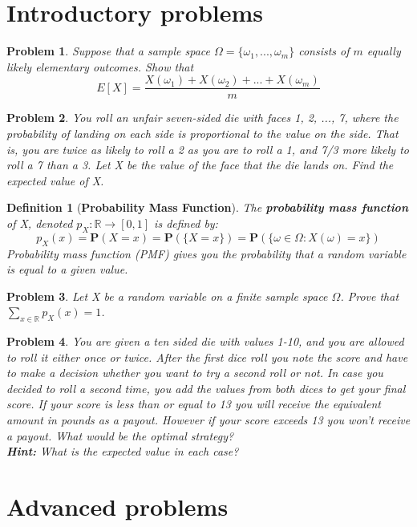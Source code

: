 \documentclass[a4paper,12pt]{article}
\theoremstyle{perfect}
\newtheorem{dfn}{Definition}
\newtheorem{prb}{Problem}
\newcommand{\R}{\mathbb{R}}
\newcommand{\PP}{\mathbf{P}}
\begin{document}
\section{Introductory problems}

\begin{prb}
Suppose that a sample space $\Omega = \{\omega_1, ..., \omega_m\}$ consists of $m$ equally likely elementary outcomes. Show that 
$$E[X] = \frac{X(\omega_1) + X(\omega_2) + ... + X(\omega_m)}{m}$$
\end{prb}

\begin{prb}
You roll an unfair seven-sided die with faces 1, 2, ..., 7, where the probability of landing on each side is proportional to the value on the side. That is, you are twice as likely to roll a 2 as you are to roll a 1, and 7/3 more likely to roll a 7 than a 3. Let X be the value of the face that the die lands on. Find the expected value of X.
\end{prb}

\begin{dfn}[\textbf{Probability Mass Function}]
The \textbf{probability mass function} of X, denoted $p_X : \R \to [0, 1]$ is defined by:
$$p_X(x) = \PP(X = x) = \PP(\{X = x\}) = \PP(\{\omega \in \Omega: X(\omega) = x\})$$
Probability mass function (PMF) gives you the probability that a random variable is equal to a given value. 
\end{dfn}

\begin{prb}
Let X be a random variable on a finite sample space $\Omega$. Prove that $\sum_{x \in \R} p_X(x) = 1$.
\end{prb}

\begin{prb}
You are given a ten sided die with values 1-10, and you are allowed to roll it either once or twice.
After the first dice roll you note the score and have to make a decision whether you want to try a second roll or not.
In case you decided to roll a second time, you add the values from both dices to get your final score.
If your score is less than or equal to 13 you will receive the equivalent amount in pounds as a payout. However if your score exceeds 13 you won't receive a payout.
What would be the optimal strategy? \\
\textbf{Hint:} What is the expected value in each case?
\end{prb}

\section{Advanced problems}
\end{document}
